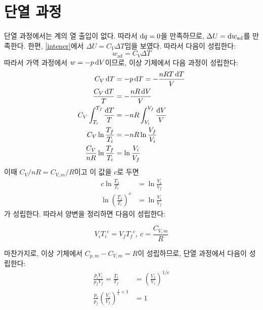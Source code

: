     \section{단열 과정}
        \hspace{\parindent}단열 과정에서는 계의 열 출입이 없다. 따라서 $\operatorname{d\!} q = 0$을 만족하므로, $\Delta U = \operatorname{d\!} w_{\mathrm{ad}}$를 만족한다. 
        한편, \ref{intener}에서 $\Delta U = C_V \Delta T$임을 보였다. 따라서 다음이 성립한다:
        \begin{equation*}
            w_{\mathrm{ad}} = C_V \Delta T
        \end{equation*}
        따라서 가역 과정에서 $w = -p \operatorname{d\!} V$이므로, 이상 기체에서 다음 과정이 성립한다:
        \begin{equation*}
        \begin{aligned}
            C_V \operatorname{d\!} T &= -p\operatorname{d\!} T = -\frac{nRT\operatorname{d\!} T}{V}\\
            \frac{C_V \operatorname{d\!} T}{T} &= -\frac{nR\operatorname{d\!} V}{V}\\
            C_V \int_{T_i}^{T_f} \frac{\operatorname{d\!} T}{T} &= -nR \int_{V_i}^{V_f} \frac{\operatorname{d\!} V}{V}\\
            C_V \ln{\frac{T_f}{T_i}} &= -nR\ln{\frac{V_f}{V_i}}\\
            \frac{C_V}{nR} \ln{\frac{T_f}{T_i}} &= \ln{\frac{V_i}{V_f}}
        \end{aligned}
        \end{equation*}
        이때 $C_V /nR = C_{V,m}/R$이고 이 값을 $c$로 두면
        \begin{equation*}
            \begin{aligned}
                c \ln{\frac{T_f}{T_i}} &= \ln{\frac{V_i}{V_f}}\\
                \ln{\left(\frac{T_f}{T_i}\right)^c} &= \ln{\frac{V_i}{V_f}}
            \end{aligned}
        \end{equation*}
        가 성립한다. 따라서 양변을 정리하면 다음이 성립한다:
        \begin{obs}
        \begin{equation*}
            V_i {T_i}^c = V_f {T_f}^c,\ c=\frac{C_{V,m}}{R}
        \end{equation*}
        \end{obs}
        \par 마찬가지로, 이상 기체에서 $C_{p,m}-C_{V,m} = R$이 성립하므로, 단열 과정에서 다음이 성립한다:
        \begin{equation*}
            \begin{aligned}
                \frac{p_i V_i}{p_f V_f} = \frac{T_i}{T_f} &= \left(\frac{V_f}{V_i}\right)^{1/c}\\
                \frac{p_i}{p_f}\left(\frac{V_i}{V_f}\right)^{\frac{1}{c} + 1} &= 1
            \end{aligned}
        \end{equation*}
